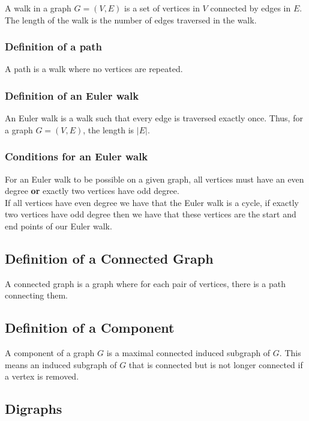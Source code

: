 \documentclass[a4paper, 12pt, twoside]{article}
\begin{document}
A walk in a graph $G = (V, E)$ is a set of vertices in $V$ connected
by edges in $E$. The length of the walk is the number of edges
traversed in the walk.

\subsubsection{Definition of a path}

A path is a walk where no vertices are repeated.

\subsubsection{Definition of an Euler walk}

An Euler walk is a walk such that every edge is traversed exactly
once. Thus, for a graph $G = (V, E)$, the length is $|E|$.

\subsubsection{Conditions for an Euler walk}

For an Euler walk to be possible on a given graph,
all vertices must have an even degree \textbf{or} exactly
two vertices have odd degree. 
\\[\baselineskip]
If all vertices have even degree we 
have that the Euler walk is a cycle, if exactly two vertices have
odd degree then we have that these vertices are the start and end
points of our Euler walk. 

\subsection{Definition of a Connected Graph}

A connected graph is a graph where for each pair of vertices,
there is a path connecting them.

\subsection{Definition of a Component}

A component of a graph $G$ is a maximal connected 
induced subgraph of $G$. This means an induced subgraph of $G$
that is connected but is not longer connected if a vertex is
removed.

\subsection{Digraphs}
\end{document}
